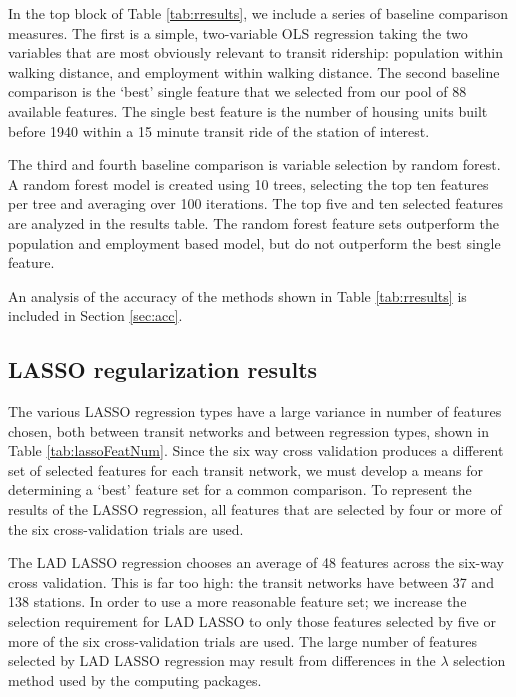 \documentclass[11pt]{article}
\begin{document}
In the top block of Table \ref{tab:rresults}, we include a series of baseline comparison measures. The first is a simple, two-variable OLS regression taking the two variables that are most obviously relevant to transit ridership: population within walking distance, and employment within walking distance. The second baseline comparison is the `best' single feature that we selected from our pool of 88 available features. The single best feature is the number of housing units built before 1940 within a 15 minute transit ride of the station of interest. 

The third and fourth baseline comparison is variable selection by random forest. A random forest model is created using 10 trees, selecting the top ten features per tree and averaging over 100 iterations. The top five and ten selected features are analyzed in the results table. The random forest feature sets outperform the population and employment based model, but do not outperform the best single feature. 

An analysis of the accuracy of the methods shown in Table \ref{tab:rresults} is included in Section \ref{sec:acc}.

\subsection{LASSO regularization results}

The various LASSO regression types have a large variance in number of features chosen, both between transit networks and between regression types, shown in Table \ref{tab:lassoFeatNum}. Since the six way cross validation produces a different set of selected features for each transit network, we must develop a means for determining a `best' feature set for a common comparison. To represent the results of the LASSO regression, all features that are selected by four or more of the six cross-validation trials are used. 

The LAD LASSO regression chooses an average of 48 features across the six-way cross validation. This is far too high: the transit networks have between 37 and 138 stations. In order to use a more reasonable feature set; we increase the selection requirement for LAD LASSO to only those features selected by five or more of the six cross-validation trials are used. The large number of features selected by LAD LASSO regression may result from  differences in the $\lambda$ selection method used by the computing packages. 
\end{document}
